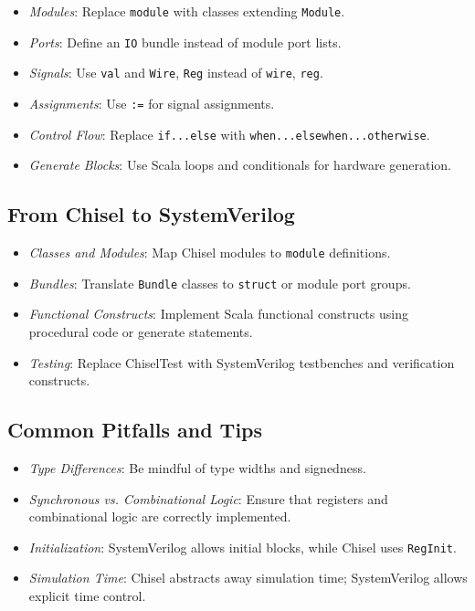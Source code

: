 \begin{itemize}
    \item \textit{Modules}: Replace \texttt{module} with classes extending \texttt{Module}.
    \item \textit{Ports}: Define an \texttt{IO} bundle instead of module port lists.
    \item \textit{Signals}: Use \texttt{val} and \texttt{Wire}, \texttt{Reg} instead of \texttt{wire}, \texttt{reg}.
    \item \textit{Assignments}: Use \texttt{:=} for signal assignments.
    \item \textit{Control Flow}: Replace \texttt{if...else} with \texttt{when...elsewhen...otherwise}.
    \item \textit{Generate Blocks}: Use Scala loops and conditionals for hardware generation.
\end{itemize}

\subsection{From Chisel to SystemVerilog}

\begin{itemize}
    \item \textit{Classes and Modules}: Map Chisel modules to \texttt{module} definitions.
    \item \textit{Bundles}: Translate \texttt{Bundle} classes to \texttt{struct} or module port groups.
    \item \textit{Functional Constructs}: Implement Scala functional constructs using procedural code or generate statements.
    \item \textit{Testing}: Replace ChiselTest with SystemVerilog testbenches and verification constructs.
\end{itemize}

\subsection{Common Pitfalls and Tips}

\begin{itemize}
    \item \textit{Type Differences}: Be mindful of type widths and signedness.
    \item \textit{Synchronous vs. Combinational Logic}: Ensure that registers and combinational logic are correctly implemented.
    \item \textit{Initialization}: SystemVerilog allows initial blocks, while Chisel uses \texttt{RegInit}.
    \item \textit{Simulation Time}: Chisel abstracts away simulation time; SystemVerilog allows explicit time control.
\end{itemize}




